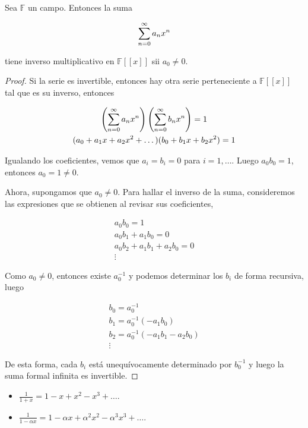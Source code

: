 \begin{teo}
    Sea $\mathbb{F}$ un campo. Entonces la suma
    
    \[
    \sum_{n=0}^{\infty} a_nx^n
    \]
    
    \noindent tiene inverso multiplicativo en $\mathbb{F}[[x]]$ sii $a_0 \neq 0$.
\end{teo}

\begin{proof}
    Si la serie es invertible, entonces hay otra serie perteneciente a $\mathbb{F}[[x]]$ tal que es su inverso, entonces
    
    \begin{gather*}
        \left(\sum_{n=0}^{\infty} a_nx^n\right)\left(\sum_{n=0}^{\infty} b_nx^n\right) = 1 \\
        (a_0 + a_1x + a_2x^2 + \dots)(b_0 + b_1x + b_2x^2) = 1
    \end{gather*}
    
    Igualando los coeficientes, vemos que $a_i = b_i = 0$ para $i = 1, \dots$. Luego $a_0b_0 = 1$, entonces $a_0 = 1 \neq 0$.
    
    Ahora, supongamos que $a_0 \neq 0$. Para hallar el inverso de la suma, consideremos las expresiones que se obtienen al revisar sus coeficientes,
    
    \begin{gather*}
        a_0b_0 = 1 \\
        a_0b_1 + a_1b_0 = 0 \\
        a_0b_2 + a_1b_1 + a_2b_0 = 0 \\
        \vdots
    \end{gather*}
    
    Como $a_0 \neq 0$, entonces existe $a_0^{-1}$ y podemos determinar los $b_i$ de forma recursiva, luego
    
    \begin{gather*}
        b_0 = a_0^{-1} \\
        b_1 = a_0^{-1}(-a_1b_0) \\
        b_2 = a_0^{-1}(-a_1b_1 - a_2b_0) \\
        \vdots
    \end{gather*}
    
    De esta forma, cada $b_i$ está unequívocamente determinado por $b_0^{-1}$ y luego la suma formal infinita es invertible.
\end{proof}

\begin{ejem}
    \begin{itemize}
        \item $\displaystyle \frac{1}{1+x} = 1 - x + x^2 - x^3 + \dots$.
        \item $\displaystyle \frac{1}{1-\alpha x} = 1 - \alpha x + \alpha^2x^2 - \alpha^3x^3 + \dots$.
    \end{itemize}
\end{ejem}

